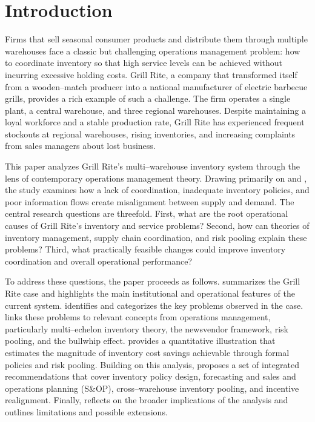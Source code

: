 \documentclass[12pt,a4paper]{article}
\begin{document}



\section{Introduction}
\label{sec:introduction}

Firms that sell seasonal consumer products and distribute them through multiple warehouses face a classic but challenging operations management problem: how to coordinate inventory so that high service levels can be achieved without incurring excessive holding costs. Grill Rite, a company that transformed itself from a wooden–match producer into a national manufacturer of electric barbecue grills, provides a rich example of such a challenge. The firm operates a single plant, a central warehouse, and three regional warehouses. Despite maintaining a loyal workforce and a stable production rate, Grill Rite has experienced frequent stockouts at regional warehouses, rising inventories, and increasing complaints from sales managers about lost business.

This paper analyzes Grill Rite's multi–warehouse inventory system through the lens of contemporary operations management theory. Drawing primarily on \citet{stevenson2017operations} and \citet{cachon2018matching}, the study examines how a lack of coordination, inadequate inventory policies, and poor information flows create misalignment between supply and demand. The central research questions are threefold. First, what are the root operational causes of Grill Rite's inventory and service problems? Second, how can theories of inventory management, supply chain coordination, and risk pooling explain these problems? Third, what practically feasible changes could improve inventory coordination and overall operational performance?

To address these questions, the paper proceeds as follows.  summarizes the Grill Rite case and highlights the main institutional and operational features of the current system.  identifies and categorizes the key problems observed in the case.  links these problems to relevant concepts from operations management, particularly multi–echelon inventory theory, the newsvendor framework, risk pooling, and the bullwhip effect.  provides a quantitative illustration that estimates the magnitude of inventory cost savings achievable through formal policies and risk pooling. Building on this analysis,  proposes a set of integrated recommendations that cover inventory policy design, forecasting and sales and operations planning (S\&OP), cross–warehouse inventory pooling, and incentive realignment. Finally,  reflects on the broader implications of the analysis and outlines limitations and possible extensions.
\end{document}
